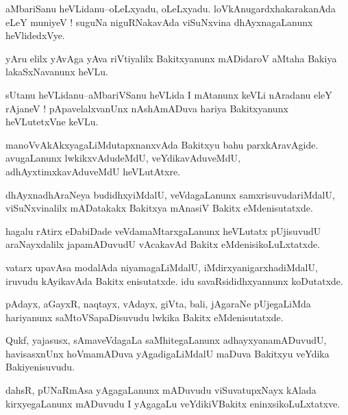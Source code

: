\documentclass{article}
\begin{document}
\begin{mn}%
aMbariSanu heVLidanu--oLeLxyadu, oLeLxyadu. loVkAnugardxhakarakanAda eLeY muniyeV ! suguNa 
niguRNakavAda viSuNxvina dhAyxnagaLanunx heVlidedxVye.
\end{mn}

\begin{mn}%
yAru elilx yAvAga yAva riVtiyalilx Bakitxyanunx mADidaroV aMtaha Bakiya lakaSxNavanunx heVLu.
\end{mn}

\begin{mn}%
sUtanu heVLidanu--aMbariVSanu heVLida I mAtanunx keVLi nAradanu eleY rAjaneV ! 
pApavelalxvanUnx nAshAmADuva hariya Bakitxyanunx heVLutetxVne keVLu.
\end{mn}

\begin{mn}%
manoVvAkAkxyagaLiMdutapxnanxvAda Bakitxyu bahu parxkAravAgide. avugaLanunx 
lwkikxvAdudeMdU, veYdikavAduveMdU, adhAyxtimxkavAduveMdU heVLutAtxre.
\end{mn}

\begin{mn}%
dhAyxnadhAraNeya budidhxyiMdalU, veVdagaLanunx samxrisuvudariMdalU, viSuNxvinalilx 
mADatakakx Bakitxya mAnasiV Bakitx eMdenisutatxde.
\end{mn}

\begin{mn}%
hagalu rAtirx eDabiDade veVdamaMtarxgaLanunx heVLutatx pUjisuvudU araNayxdalilx 
japamADuvudU vAcakavAd Bakitx eMdenisikoLuLxtatxde.
\end{mn}

\begin{mn}%
vatarx upavAsa modalAda niyamagaLiMdalU, iMdirxyanigarxhadiMdalU, iruvudu kAyikavAda 
Bakitx enisutatxde. idu savaRsididhxyannunx koDutatxde.
\end{mn}

\begin{mn}%
pAdayx, aGayxR, naqtayx, vAdayx, giVta, bali, jAgaraNe pUjegaLiMda hariyanunx 
saMtoVSapaDisuvudu lwkika Bakitx eMdenisutatxde.
\end{mn}

\begin{mn}%
Qukf, yajasusx, sAmaveVdagaLa saMhitegaLanunx adhayxyanamADuvudU, havisasxnUnx hoVmamADuva 
yAgadigaLiMdalU maDuva Bakitxyu veYdika Bakiyenisuvudu.
\end{mn}

\begin{mn}%
dahsR, pUNaRmAsa yAgagaLanunx mADuvudu viSuvatupxNayx kAlada kirxyegaLanunx mADuvudu I 
yAgagaLu veYdikiVBakitx eninxsikoLuLxtatxve.
\end{mn}
\end{document}
